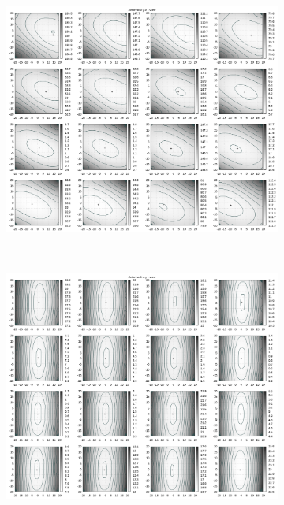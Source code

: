 \begin{appendix}
\begin{figure}[!ht]
\begin{subfigure}[t]{0.3\textwidth}
	\end{subfigure}
	\begin{subfigure}[t]{0.3\textwidth}
			\centering
	   \includegraphics[width=\textwidth]{img/fitness/yz/a0.png}
	\end{subfigure}
\\
	\centering
	\begin{subfigure}[t]{0.3\textwidth}
	     \centering
	     \includegraphics[width=\textwidth]{img/fitness/xy/a1.png}

\end{subfigure}
\end{figure}
\end{appendix}
